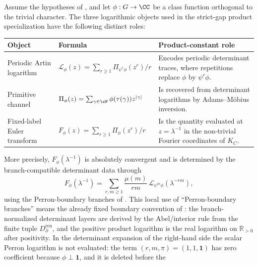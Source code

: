 \begin{proposition}
  \label{prop:three-logarithm-product-interface}
  Assume the hypotheses of , and let
  \(\phi:G\to\CC\) be a class function orthogonal to the trivial
  character.  The three logarithmic objects used in the strict-gap product specialization have
  the following distinct roles:
  \begin{center}
  \begin{tabular}{@{}L{0.25\textwidth}L{0.36\textwidth}L{0.29\textwidth}@{}}
  \toprule
  Object & Formula & Product-constant role \\
  \midrule
  Periodic Artin logarithm
  & \(\mathcal L_\phi(z)=\sum_{r\ge1}\Pi_{\psi^r\phi}(z^r)/r\)
  & Encodes periodic determinant traces, where repetitions replace
    \(\phi\) by \(\psi^r\phi\). \\
  Primitive channel
  & \(\Pi_\phi(z)=\sum_{\gamma\in\cP}\phi(\tau(\gamma))z^{|\gamma|}\)
  & Is recovered from determinant logarithms by Adams--M\"obius inversion. \\
  Fixed-label Euler transform
  & \(F_\phi(z)=\sum_{r\ge1}\Pi_\phi(z^r)/r\)
  & Is the quantity evaluated at \(z=\lambda^{-1}\) in the non-trivial
    Fourier coordinates of \(K_C\). \\
  \bottomrule
  \end{tabular}
  \end{center}
  More precisely, \(F_\phi(\lambda^{-1})\) is absolutely convergent and is
  determined by the branch-compatible determinant data through
  \begin{equation}\label{eq:three-logarithm-product-interface}
    F_\phi(\lambda^{-1})
    =
    \sum_{r,m\ge1}\frac{\mu(m)}{rm}\,
      \mathcal L_{\psi^m\phi}(\lambda^{-rm}),
  \end{equation}
  using the Perron-boundary branches of
  .
  This local use of ``Perron-boundary branches'' means the already fixed
  boundary convention of : the
  branch-normalized determinant layers are derived by the Abel/interior rule
  from the finite tuple \(D_{\partial}^{\mathrm{ren}}\), and the positive
  product logarithm is the real logarithm on \(\mathbb R_{>0}\) after
  positivity.
  In the determinant expansion of the right-hand side the scalar Perron
  logarithm is not evaluated: the term \((r,m,\pi)=(1,1,\mathbf1)\) has zero
  coefficient because \(\phi\perp\mathbf1\), and it is deleted before the

\end{proposition}
